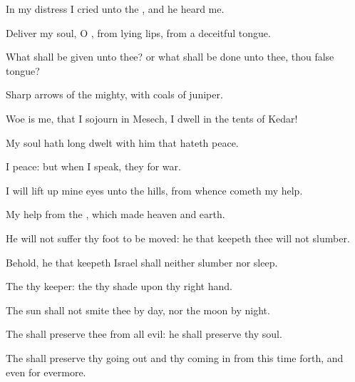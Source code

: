 {\Q {}In my
distress I
cried unto the
{}, and he
heard me.


\par }{\Q {}Deliver my
soul, O
{}, from
lying
lips,
{} from a
deceitful
tongue.


\par }{\Q {}What shall be
given unto thee? or what shall be
done unto thee, thou
false
tongue?


\par }{\Q {}Sharp
arrows of the
mighty, with
coals of
juniper.


\par }{\BB \par }
{\Q {}Woe is me, that I
sojourn in
Mesech,
{} I
dwell in the
tents of
Kedar!


\par }{\Q {}My
soul hath
long
dwelt with him that
hateth
peace.


\par }{\Q {}I
{}
peace: but when I
speak, they
{} for
war.




\par }
{\Q {}I will lift
up mine
eyes unto the
hills, from
whence
cometh my
help.


\par }{\Q {}My
help
{} from the
{}, which
made
heaven and
earth.


\par }{\Q {}He will not
suffer thy
foot to be
moved: he that
keepeth thee will not
slumber.


\par }{\Q {}Behold, he that
keepeth
Israel shall neither
slumber nor
sleep.


\par }{\Q {}The
{}
{} thy
keeper: the
{}
{} thy
shade upon thy
right
hand.


\par }{\Q {}The
sun shall not
smite thee by
day, nor the
moon by
night.


\par }{\Q {}The
{} shall
preserve thee from all
evil: he shall
preserve thy
soul.


\par }{\Q {}The
{} shall
preserve thy going
out and thy coming
in from this time forth, and even
for
evermore.




\par }
